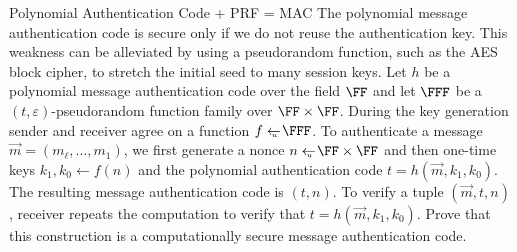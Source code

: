 \documentclass{crypto-exercise}
\author{Sven Laur}
\begin{document}
\begin{exercise}{Polynomial Authentication Code + PRF = MAC}
The polynomial message authentication code is secure only if we do not reuse the authentication key. This weakness can be alleviated by using a pseudorandom function, such as the AES block cipher, to stretch the initial seed to many session keys.  Let $h$ be a polynomial message authentication code over the field $\FF$ and let $\FFF$ be a $(t,\varepsilon)$-pseudorandom function family over $\FF\times\FF$. During the key generation sender and receiver agree on a function $f\getsu\FFF$. To authenticate a message $\vec{m}=(m_\ell,\ldots, m_1)$, we first generate a nonce $n\getsu \FF\times\FF$ and then one-time keys $k_1,k_0\gets f(n)$ and the polynomial authentication code $t=h(\vec{m}, k_1,k_0)$. The resulting message authentication code is $(t, n)$. To verify a tuple $(\vec{m},t, n)$, receiver repeats the computation to verify that $t= h(\vec{m}, k_1,k_0)$. Prove that this
construction is a computationally secure message authentication code.
 \end{exercise}
\end{document}
